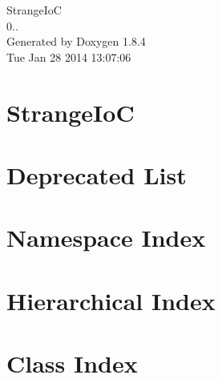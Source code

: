 \documentclass[twoside]{book}
\newcommand{\clearemptydoublepage}{%
  \newpage{\pagestyle{empty}\cleardoublepage}%
}
\begin{document}
\hypersetup{pageanchor=false}
\begin{titlepage}
\vspace*{7cm}
\begin{center}%
{\Large Strange\-Io\-C \\[1ex]\large 0.. }\\
\vspace*{1cm}
{\large Generated by Doxygen 1.8.4}\\
\vspace*{0.5cm}
{\small Tue Jan 28 2014 13:07:06}\\
\end{center}
\end{titlepage}
\clearemptydoublepage
\tableofcontents
\clearemptydoublepage
{}
\hypersetup{pageanchor=true}

\chapter{Strange\-Io\-C}
\label{index}\hypertarget{index}{}
\chapter{Deprecated List}
\label{deprecated}
\hypertarget{deprecated}{}

\chapter{Namespace Index}

\chapter{Hierarchical Index}

\chapter{Class Index}

\end{document}
